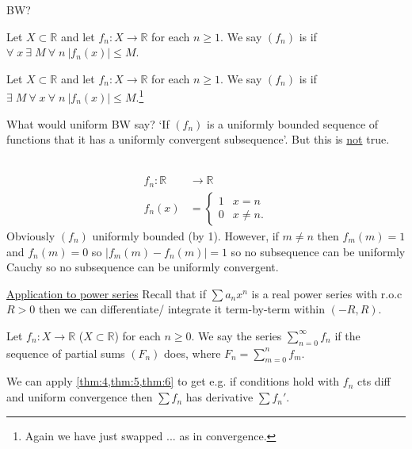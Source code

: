 BW?

\begin{definition}
    Let $X \subset \mathbb{R}$ and let $f_n : X \to \mathbb{R}$ for each $n \geq 1$.
    We say $(f_n)$ is  if $\forall \; x \ \exists \; M \ \forall \; n \ |f_n(x)| \leq M$.
\end{definition} 

\begin{definition}
    Let $X \subset \mathbb{R}$ and let $f_n : X \to \mathbb{R}$ for each $n \geq 1$.
    We say $(f_n)$ is  if $\exists \; M \ \forall \; x \ \forall \; n \ |f_n(x)| \leq M$.\footnote{Again we have just swapped ... as in convergence.}
\end{definition} 

What would uniform BW say?
`If $(f_n)$ is a uniformly bounded sequence of functions that it has a uniformly convergent subsequence'.
But this is \underline{not} true.

\begin{example}[Counterexample of BW] ~\vspace*{-1.5\baselineskip}
    \begin{align*}
        f_n : \mathbb{R} &\to \mathbb{R} \\
        f_n(x) &= \begin{cases}
            1 & x = n \\
            0 & x \neq n.
        \end{cases}
    \end{align*} 
    Obviously $(f_n)$ uniformly bounded (by 1).
    However, if $m \neq n$ then $f_m(m) = 1$ and $f_n(m) = 0$ so $|f_m(m) - f_n(m)| = 1$ so no subsequence can be uniformly Cauchy so no subsequence can be uniformly convergent.
\end{example} 

\underline{Application to power series}
Recall that if $\sum a_n x^n$ is a real power series with r.o.c $R > 0$ then we can differentiate/ integrate it term-by-term within $(-R, R)$.

\begin{definition}
    Let $f_n : X \to \mathbb{R}$ ($X \subset \mathbb{R}$) for each $n \geq 0$.
    We say the series $\sum_{n=0}^{\infty} f_n$  if the sequence of partial sums $(F_n)$ does, where $F_n = \sum_{m=0}^{n} f_m$.
\end{definition} 
We can apply \cref{thm:4,thm:5,thm:6} to get e.g. if conditions hold with $f_n$ cts diff and uniform convergence then $\sum f_n$ has derivative $\sum f_n'$.

